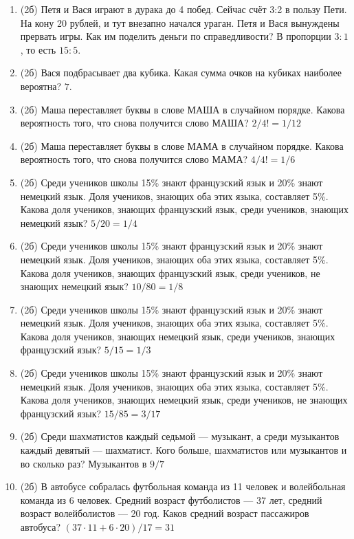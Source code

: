 \documentclass[a4paper, 12pt]{article}
\begin{document}
\begin{enumerate}[resume]
  \item (2б) Петя и Вася играют в дурака до 4 побед. Сейчас счёт 3:2 в пользу Пети. На кону 20 рублей, и тут внезапно начался ураган. Петя и Вася вынуждены прервать игры. Как им поделить деньги по справедливости? В пропорции $3:1$, то есть $15:5$.
  \item (2б) Вася подбрасывает два кубика. Какая сумма очков на кубиках наиболее вероятна? $7$.
  \item (2б) Маша переставляет буквы в слове МАША в случайном порядке. Какова вероятность того, что снова получится слово МАША? $2/4!=1/12$
  \item (2б) Маша переставляет буквы в слове МАМА в случайном порядке. Какова вероятность того, что снова получится слово МАМА? $4/4!=1/6$
  \item (2б) Среди учеников школы 15\% знают французский язык и 20\% знают немецкий язык. Доля учеников, знающих оба этих языка, составляет 5\%. Какова доля учеников, знающих французский язык, среди учеников, знающих немецкий язык? $5/20=1/4$
  \item (2б) Среди учеников школы 15\% знают французский язык и 20\% знают немецкий язык. Доля учеников, знающих оба этих языка, составляет 5\%. Какова доля учеников, знающих французский язык, среди учеников, не знающих немецкий язык? $10/80=1/8$
  \item (2б) Среди учеников школы 15\% знают французский язык и 20\% знают немецкий язык. Доля учеников, знающих оба этих языка, составляет 5\%. Какова доля учеников, знающих немецкий язык, среди учеников, знающих французский язык? $5/15=1/3$
  \item (2б) Среди учеников школы 15\% знают французский язык и 20\% знают немецкий язык. Доля учеников, знающих оба этих языка, составляет 5\%. Какова доля учеников, знающих немецкий язык, среди учеников, не знающих французский язык? $15/85=3/17$
  \item (2б) Среди шахматистов каждый седьмой — музыкант, а среди музыкантов каждый девятый — шахматист. Кого больше, шахматистов или музыкантов и во сколько раз? Музыкантов в $9/7$
  \item (2б) В автобусе собралась футбольная команда из 11 человек и волейбольная команда из 6 человек. Средний возраст футболистов — 37 лет, средний возраст волейболистов — 20 год. Каков средний возраст пассажиров автобуса? $(37 \cdot 11 + 6 \cdot 20)/17=31$
\end{enumerate}
\end{document}
